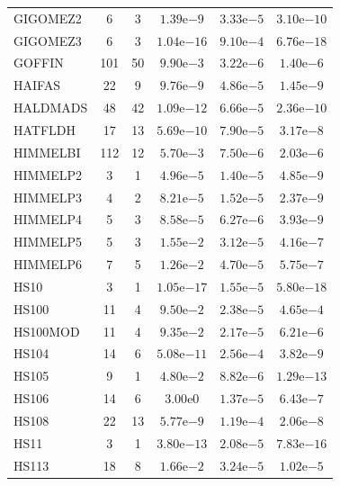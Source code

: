 \documentclass[11pt]{article}
\begin{document}
\begin{center}
\begin{longtable}{lccccc}
GIGOMEZ2 & 6 & 3 & $1.39\mathrm{e}{-9}$ & $3.33\mathrm{e}{-5}$ & $3.10\mathrm{e}{-10}$ \\
GIGOMEZ3 & 6 & 3 & $1.04\mathrm{e}{-16}$ & $9.10\mathrm{e}{-4}$ & $6.76\mathrm{e}{-18}$ \\
GOFFIN & 101 & 50 & $9.90\mathrm{e}{-3}$ & $3.22\mathrm{e}{-6}$ & $1.40\mathrm{e}{-6}$ \\
HAIFAS & 22 & 9 & $9.76\mathrm{e}{-9}$ & $4.86\mathrm{e}{-5}$ & $1.45\mathrm{e}{-9}$ \\
HALDMADS & 48 & 42 & $1.09\mathrm{e}{-12}$ & $6.66\mathrm{e}{-5}$ & $2.36\mathrm{e}{-10}$ \\
HATFLDH & 17 & 13 & $5.69\mathrm{e}{-10}$ & $7.90\mathrm{e}{-5}$ & $3.17\mathrm{e}{-8}$ \\
HIMMELBI & 112 & 12 & $5.70\mathrm{e}{-3}$ & $7.50\mathrm{e}{-6}$ & $2.03\mathrm{e}{-6}$ \\
HIMMELP2 & 3 & 1 & $4.96\mathrm{e}{-5}$ & $1.40\mathrm{e}{-5}$ & $4.85\mathrm{e}{-9}$ \\
HIMMELP3 & 4 & 2 & $8.21\mathrm{e}{-5}$ & $1.52\mathrm{e}{-5}$ & $2.37\mathrm{e}{-9}$ \\
HIMMELP4 & 5 & 3 & $8.58\mathrm{e}{-5}$ & $6.27\mathrm{e}{-6}$ & $3.93\mathrm{e}{-9}$ \\
HIMMELP5 & 5 & 3 & $1.55\mathrm{e}{-2}$ & $3.12\mathrm{e}{-5}$ & $4.16\mathrm{e}{-7}$ \\
HIMMELP6 & 7 & 5 & $1.26\mathrm{e}{-2}$ & $4.70\mathrm{e}{-5}$ & $5.75\mathrm{e}{-7}$ \\
HS10 & 3 & 1 & $1.05\mathrm{e}{-17}$ & $1.55\mathrm{e}{-5}$ & $5.80\mathrm{e}{-18}$ \\
HS100 & 11 & 4 & $9.50\mathrm{e}{-2}$ & $2.38\mathrm{e}{-5}$ & $4.65\mathrm{e}{-4}$ \\
HS100MOD & 11 & 4 & $9.35\mathrm{e}{-2}$ & $2.17\mathrm{e}{-5}$ & $6.21\mathrm{e}{-6}$ \\
HS104 & 14 & 6 & $5.08\mathrm{e}{-11}$ & $2.56\mathrm{e}{-4}$ & $3.82\mathrm{e}{-9}$ \\
HS105 & 9 & 1 & $4.80\mathrm{e}{-2}$ & $8.82\mathrm{e}{-6}$ & $1.29\mathrm{e}{-13}$ \\
HS106 & 14 & 6 & $3.00\mathrm{e}{0}$ & $1.37\mathrm{e}{-5}$ & $6.43\mathrm{e}{-7}$ \\
HS108 & 22 & 13 & $5.77\mathrm{e}{-9}$ & $1.19\mathrm{e}{-4}$ & $2.06\mathrm{e}{-8}$ \\
HS11 & 3 & 1 & $3.80\mathrm{e}{-13}$ & $2.08\mathrm{e}{-5}$ & $7.83\mathrm{e}{-16}$ \\
HS113 & 18 & 8 & $1.66\mathrm{e}{-2}$ & $3.24\mathrm{e}{-5}$ & $1.02\mathrm{e}{-5}$ \\

\end{longtable}
\end{center}
\end{document}
